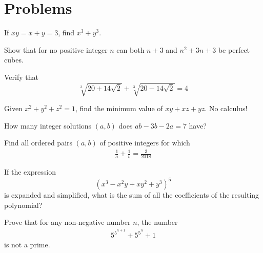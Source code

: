 \documentclass{article}
\begin{document}

\section{Problems} 
\begin{exercise}[Hint: 2]
If $xy=x+y = 3$, find $x^3+y^3$.
\end{exercise}

\begin{exercise}[Hint: 3]
    Show that for no positive integer $n$ can both $n+3$ and $n^2 +3n+3$ be perfect cubes.
\end{exercise}

\begin{exercise}[Hint: 1]
Verify that
\[\sqrt[3]{20+14\sqrt{2}}+\sqrt[3]{20-14\sqrt{2}}=4\]
\end{exercise}

\begin{exercise}[Hint: 6]
Given $x^2 + y^2 + z^2 = 1$, find the minimum value of $xy+xz+yz$. No calculus!
\end{exercise}

\begin{exercise}
How many integer solutions \((a,b)\) does \(ab-3b-2a=7\) have?
\end{exercise}

\begin{exercise}[2018 A1, Hint: 11]
Find all ordered pairs \((a,b)\) of positive integers for
which
\begin{align*} 
    \frac{1}{a} + \frac{1}{b} = \frac{3}{2018}
\end{align*}
\end{exercise}

\begin{exercise}
If the expression 
\[(x^3-x^2y+xy^2+y^3)^5\] 
is expanded and simplified, what is the sum of all the coefficients of the resulting polynomial?
\end{exercise}

\begin{exercise}[Hint: 10]
Prove that for any non-negative number $n$, the number 
\begin{align*}
    5^{5^{n+1}} + 5^{5^n} + 1
\end{align*}
is not a prime.
\end{exercise}
\end{document}
